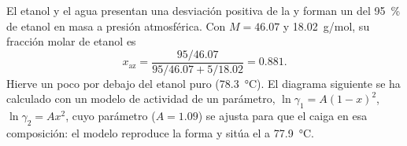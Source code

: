 \begin{example}\label{ex:b2:liquid-vapour-diagrams:ethanol-water}
El etanol y el agua presentan una desviación positiva de la  y forman un 
del 95~\% de etanol en masa a presión atmosférica. Con $M = 46.07$ y
\qty{18.02}{g/mol}, su fracción molar de etanol es
\[
  x_{\text{az}} = \frac{95/46.07}{95/46.07 + 5/18.02} = 0.881 .
\]
Hierve un poco por debajo del etanol puro (\qty{78.3}{\degreeCelsius}). El diagrama
siguiente se ha calculado con un modelo de actividad de un parámetro, $\ln\gamma_1 = A(1 -
x)^2$, $\ln\gamma_2 = Ax^2$, cuyo parámetro ($A = 1.09$) se ajusta para que el
 caiga en esa composición: el modelo reproduce la forma y
sitúa el  a \qty{77.9}{\degreeCelsius}.
\end{example}

